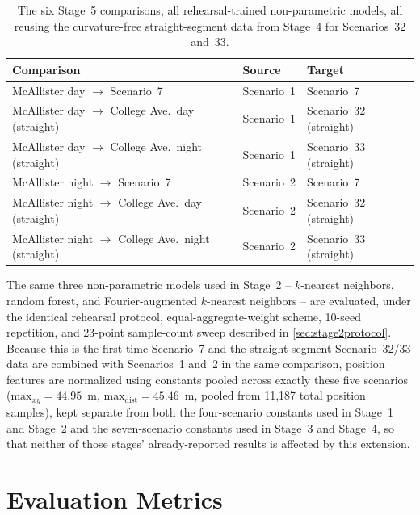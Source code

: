 \documentclass{iutbscthesis}
\begin{document}
\begin{table}[H]
    \centering
    \begin{tabular}{l l l}
        \toprule
        Comparison & Source & Target \\
        \midrule
        McAllister day $\to$ Scenario~7 & Scenario~1 & Scenario~7 \\
        McAllister day $\to$ College Ave.\ day (straight) & Scenario~1 & Scenario~32 (straight) \\
        McAllister day $\to$ College Ave.\ night (straight) & Scenario~1 & Scenario~33 (straight) \\
        McAllister night $\to$ Scenario~7 & Scenario~2 & Scenario~7 \\
        McAllister night $\to$ College Ave.\ day (straight) & Scenario~2 & Scenario~32 (straight) \\
        McAllister night $\to$ College Ave.\ night (straight) & Scenario~2 & Scenario~33 (straight) \\
        \bottomrule
    \end{tabular}
    \caption{The six Stage~5 comparisons, all rehearsal-trained non-parametric models, all reusing the curvature-free straight-segment data from Stage~4 for Scenarios~32 and~33.}
    \label{tab:stage5comparisons}
\end{table}

The same three non-parametric models used in Stage~2 -- $k$-nearest neighbors, random forest, and Fourier-augmented $k$-nearest neighbors -- are evaluated, under the identical rehearsal protocol, equal-aggregate-weight scheme, 10-seed repetition, and 23-point sample-count sweep described in \autoref{sec:stage2protocol}. Because this is the first time Scenario~7 and the straight-segment Scenario~32/33 data are combined with Scenarios~1 and~2 in the same comparison, position features are normalized using constants pooled across exactly these five scenarios ($\text{max}_{xy} = 44.95$~m, $\text{max}_{\text{dist}} = 45.46$~m, pooled from 11{,}187 total position samples), kept separate from both the four-scenario constants used in Stage~1 and Stage~2 and the seven-scenario constants used in Stage~3 and Stage~4, so that neither of those stages' already-reported results is affected by this extension.

\section{Evaluation Metrics}
\label{sec:metrics}
\end{document}
